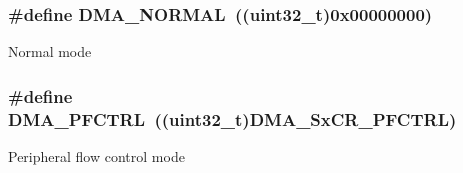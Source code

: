 \subsubsection[{\texorpdfstring{D\+M\+A\+\_\+\+N\+O\+R\+M\+AL}{DMA_NORMAL}}]{\setlength{\rightskip}{0pt plus 5cm}\#define D\+M\+A\+\_\+\+N\+O\+R\+M\+AL~((uint32\+\_\+t)0x00000000)}\hypertarget{group___d_m_a__mode_ga04941acfbbdefc53e1e08133cffa3b8a}{}\label{group___d_m_a__mode_ga04941acfbbdefc53e1e08133cffa3b8a}
Normal mode 
\subsubsection[{\texorpdfstring{D\+M\+A\+\_\+\+P\+F\+C\+T\+RL}{DMA_PFCTRL}}]{\setlength{\rightskip}{0pt plus 5cm}\#define D\+M\+A\+\_\+\+P\+F\+C\+T\+RL~((uint32\+\_\+t)D\+M\+A\+\_\+\+Sx\+C\+R\+\_\+\+P\+F\+C\+T\+RL)}\hypertarget{group___d_m_a__mode_ga7974ee645c8e275a2297cf37eec9e022}{}\label{group___d_m_a__mode_ga7974ee645c8e275a2297cf37eec9e022}
Peripheral flow control mode 